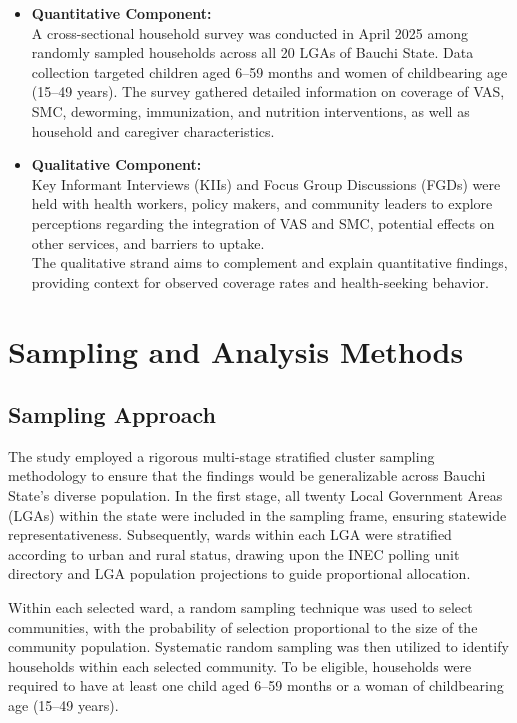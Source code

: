 \documentclass[
  11pt,
]{report}
\begin{document}
\begin{itemize}
\item
  \textbf{Quantitative Component:}\\
  A cross-sectional household survey was conducted in April 2025 among
  randomly sampled households across all 20 LGAs of Bauchi State. Data
  collection targeted children aged 6--59 months and women of
  childbearing age (15--49 years). The survey gathered detailed
  information on coverage of VAS, SMC, deworming, immunization, and
  nutrition interventions, as well as household and caregiver
  characteristics.
\item
  \textbf{Qualitative Component:}\\
  Key Informant Interviews (KIIs) and Focus Group Discussions (FGDs)
  were held with health workers, policy makers, and community leaders to
  explore perceptions regarding the integration of VAS and SMC,
  potential effects on other services, and barriers to uptake.\\
  The qualitative strand aims to complement and explain quantitative
  findings, providing context for observed coverage rates and
  health-seeking behavior.
\end{itemize}

\section{Sampling and Analysis
Methods}\label{sampling-and-analysis-methods}

\subsection{Sampling Approach}\label{sampling-approach}

The study employed a rigorous multi-stage stratified cluster sampling
methodology to ensure that the findings would be generalizable across
Bauchi State's diverse population. In the first stage, all twenty Local
Government Areas (LGAs) within the state were included in the sampling
frame, ensuring statewide representativeness. Subsequently, wards within
each LGA were stratified according to urban and rural status, drawing
upon the INEC polling unit directory and LGA population projections to
guide proportional allocation.

Within each selected ward, a random sampling technique was used to
select communities, with the probability of selection proportional to
the size of the community population. Systematic random sampling was
then utilized to identify households within each selected community. To
be eligible, households were required to have at least one child aged
6--59 months or a woman of childbearing age (15--49 years).
\end{document}
